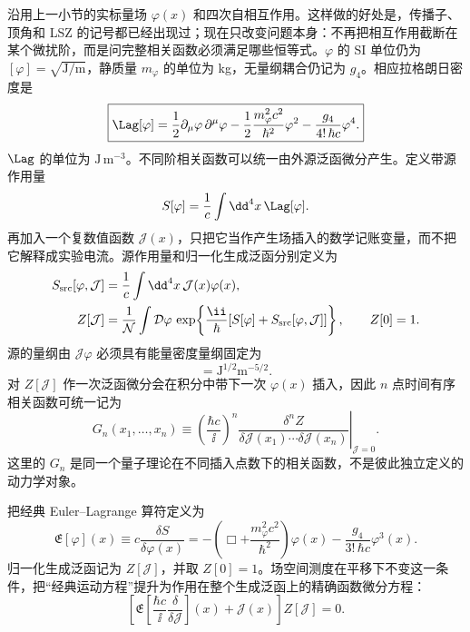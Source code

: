 
沿用上一小节的实标量场 $\varphi(x)$ 和四次自相互作用。这样做的好处是，传播子、顶角和 LSZ 的记号都已经出现过；现在只改变问题本身：不再把相互作用截断在某个微扰阶，而是问完整相关函数必须满足哪些恒等式。$\varphi$ 的 SI 单位仍为 $[\varphi]=\sqrt{\mathrm{J/m}}$，静质量 $m_\varphi$ 的单位为 kg，无量纲耦合仍记为 $g_4$。相应拉格朗日密度是
\begin{equation}
 \boxed{
 \Lag[\varphi]
 =\frac12\partial_\mu\varphi\,\partial^\mu\varphi
 -\frac12\frac{m_\varphi^2c^2}{\hbar^2}\varphi^2
 -\frac{g_4}{4!\,\hbar c}\varphi^4.}
 \label{eq:SD-scalar-L-SI-r12}
\end{equation}
$\Lag$ 的单位为 $\mathrm{J\,m^{-3}}$。不同阶相关函数可以统一由外源泛函微分产生。定义带源作用量
\begin{equation*}
 S[\varphi]=\frac1c\int\dd^4 x\,\Lag[\varphi].
\end{equation*}
再加入一个复数值函数 $\mathcal J(x)$，只把它当作产生场插入的数学记账变量，而不把它解释成实验电流。源作用量和归一化生成泛函分别定义为
\begin{align}
 S_{\rm src}[\varphi,\mathcal J]
 &=\frac1c\int\dd^4 x\,\mathcal J(x)\varphi(x),
 \label{eq:SD-source-action-dp76}\\
 Z[\mathcal J]
 &=\frac1{\mathcal N}\int\mathcal D\varphi\,
 \exp\!\left\{\frac{\ii}{\hbar}
 [S[\varphi]+S_{\rm src}[\varphi,\mathcal J]]\right\},
 \qquad Z[0]=1.
 \label{eq:SD-generating-functional-dp76}
\end{align}
源的量纲由 $\mathcal J\varphi$ 必须具有能量密度量纲固定为
\begin{equation*}
 [\mathcal J]=\mathrm{J^{1/2}m^{-5/2}}.
\end{equation*}
对 $Z[\mathcal J]$ 作一次泛函微分会在积分中带下一次 $\varphi(x)$ 插入，因此 $n$ 点时间有序相关函数可统一记为
\begin{equation}
 G_n(x_1,\ldots,x_n)
 \equiv
 \left.
 \left(\frac{\hbar c}{\ii}\right)^n
 \frac{\delta^nZ}
 {\delta\mathcal J(x_1)\cdots\delta\mathcal J(x_n)}
 \right|_{\mathcal J=0}.
 \label{eq:SD-correlator-source-definition-dp76}
\end{equation}
这里的 $G_n$ 是同一个量子理论在不同插入点数下的相关函数，不是彼此独立定义的动力学对象。

把经典 Euler--Lagrange 算符定义为
\begin{equation}
 \boxed{
 \mathfrak E[\varphi](x)
 \equiv c\frac{\delta S}{\delta\varphi(x)}
 =-\left(\Box+\frac{m_\varphi^2c^2}{\hbar^2}\right)\varphi(x)
 -\frac{g_4}{3!\,\hbar c}\varphi^3(x).}
 \label{eq:SD-euler-operator-SI-r16}
\end{equation}
归一化生成泛函记为 $Z[\mathcal J]$，并取 $Z[0]=1$。场空间测度在平移下不变这一条件，把“经典运动方程”提升为作用在整个生成泛函上的精确函数微分方程：
\begin{equation}
 \boxed{
 \left[
 \mathfrak E\!\left[
 \frac{\hbar c}{\ii}\frac{\delta}{\delta\mathcal J}
 \right](x)
 +\mathcal J(x)
 \right]Z[\mathcal J]=0.}
 \label{eq:SD-master-SI-r12}
\end{equation}

